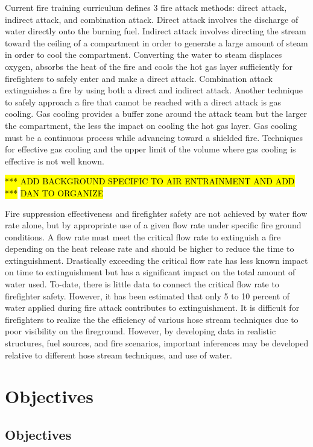 \documentclass{article}
\begin{document}
Current fire training curriculum defines 3 fire attack methods: direct attack, indirect attack, and combination attack. Direct attack involves the discharge of water directly onto the burning fuel. Indirect attack involves directing the stream toward the ceiling of a compartment in order to generate a large amount of steam in order to cool the compartment. Converting the water to steam displaces oxygen, absorbs the heat of the fire and cools the hot gas layer sufficiently for firefighters to safely enter and make a direct attack. Combination attack extinguishes a fire by using both a direct and indirect attack. Another technique to safely approach a fire that cannot be reached with a direct attack is gas cooling. Gas cooling provides a buffer zone around the attack team but the larger the compartment, the less the impact on cooling the hot gas layer. Gas cooling must be a continuous process while advancing toward a shielded fire. Techniques for effective gas cooling and the upper limit of the volume where gas cooling is effective is not well known.  

\hl{*** ADD BACKGROUND SPECIFIC TO AIR ENTRAINMENT AND ADD ***}
\hl{DAN TO ORGANIZE}

Fire suppression effectiveness and firefighter safety are not achieved by water flow rate alone, but by appropriate use of a given flow rate under specific fire ground conditions. A flow rate must meet the critical flow rate to extinguish a fire depending on the heat release rate and should be higher to reduce the time to extinguishment. Drastically exceeding the critical flow rate has less known impact on time to extinguishment but has a significant impact on the total amount of water used. To-date, there is little data to connect the critical flow rate to firefighter safety. However, it has been estimated that only 5 to 10 percent of water applied during fire attack contributes to extinguishment. It is difficult for firefighters to realize the the efficiency of various hose stream techniques due to poor visibility on the fireground. However, by developing data in realistic structures, fuel sources, and fire scenarios, important inferences may be developed relative to different hose stream techniques, and use of water.

\clearpage

\section{Objectives}

\subsection {Objectives}
\end{document}
